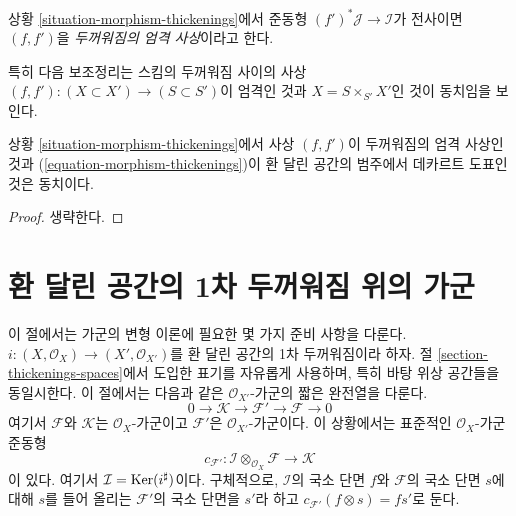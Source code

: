 \begin{definition}
\label{definition-strict-morphism-thickenings}
상황 \ref{situation-morphism-thickenings}에서 준동형
$(f')^*\mathcal{J}\longrightarrow\mathcal{I}$가 전사이면 $(f,f')$을
{\it 두꺼워짐의 엄격 사상}이라고 한다.
\end{definition}

\noindent
특히 다음 보조정리는 스킴의 두꺼워짐 사이의 사상
$(f,f'):(X\subset X')\to(S\subset S')$이 엄격인 것과
$X=S\times_{S'}X'$인 것이 동치임을 보인다.

\begin{lemma}
\label{lemma-strict-morphism-thickenings}
상황 \ref{situation-morphism-thickenings}에서 사상 $(f,f')$이 두꺼워짐의
엄격 사상인 것과 (\ref{equation-morphism-thickenings})이 환 달린 공간의
범주에서 데카르트 도표인 것은 동치이다.
\end{lemma}

\begin{proof}
생략한다.
\end{proof}




\section{환 달린 공간의 1차 두꺼워짐 위의 가군}
\label{section-modules-thickenings}

\noindent
이 절에서는 가군의 변형 이론에 필요한 몇 가지 준비 사항을 다룬다.
$i:(X,\mathcal{O}_X)\to(X',\mathcal{O}_{X'})$를 환 달린 공간의
1차 두꺼워짐이라 하자. 절 \ref{section-thickenings-spaces}에서 도입한
표기를 자유롭게 사용하며, 특히 바탕 위상 공간들을 동일시한다.
이 절에서는 다음과 같은 $\mathcal{O}_{X'}$-가군의 짧은 완전열을 다룬다.
\begin{equation}
\label{equation-extension}
0 \to \mathcal{K} \to \mathcal{F}' \to \mathcal{F} \to 0
\end{equation}
여기서 $\mathcal{F}$와 $\mathcal{K}$는 $\mathcal{O}_X$-가군이고
$\mathcal{F}'$은 $\mathcal{O}_{X'}$-가군이다. 이 상황에서는 표준적인
$\mathcal{O}_X$-가군 준동형
$$
c_{\mathcal{F}'} :
\mathcal{I} \otimes_{\mathcal{O}_X} \mathcal{F}
\longrightarrow
\mathcal{K}
$$
이 있다. 여기서 $\mathcal{I}=\mathop{\mathrm{Ker}}(i^\sharp)$이다. 구체적으로,
$\mathcal{I}$의 국소 단면 $f$와 $\mathcal{F}$의 국소 단면 $s$에 대해
$s$를 들어 올리는 $\mathcal{F}'$의 국소 단면을 $s'$라 하고
$c_{\mathcal{F}'}(f\otimes s)=fs'$로 둔다.

